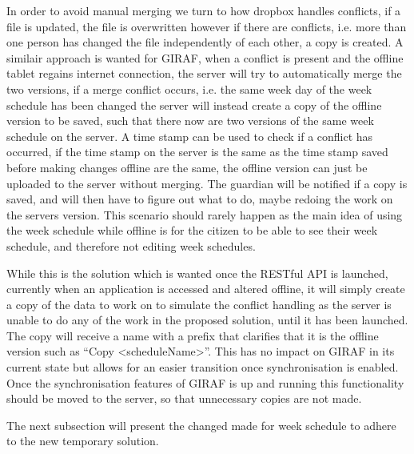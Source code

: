 In order to avoid manual merging we turn to how dropbox handles conflicts, if a file is updated, the file is overwritten however if there are conflicts, i.e. more than one person has changed the file independently of each other, a copy is created.
A similair approach is wanted for GIRAF, when a conflict is present and the offline tablet regains internet connection, the server will try to automatically merge the two versions, if a merge conflict occurs, i.e. the same week day of the week schedule has been changed the server will instead create a copy of the offline version to be saved, such that there now are two versions of the same week schedule on the server.
A time stamp can be used to check if a conflict has occurred, if the time stamp on the server is the same as the time stamp saved before making changes offline are the same, the offline version can just be uploaded to the server without merging.
The guardian will be notified if a copy is saved, and will then have to figure out what to do, maybe redoing the work on the servers version.
This scenario should rarely happen as the main idea of using the week schedule while offline is for the citizen to be able to see their week schedule, and therefore not editing week schedules.

\bigskip
While this is the solution which is wanted once the RESTful API is launched, currently when an application is accessed and altered offline, it will simply create a copy of the data to work on to simulate the conflict handling as the server is unable to do any of the work in the proposed solution, until it has been launched.
The copy will receive a name with a prefix that clarifies that it is the offline version such as \enquote{Copy <scheduleName>}.
This has no impact on GIRAF in its current state but allows for an easier transition once synchronisation is enabled.
Once the synchronisation features of GIRAF is up and running this functionality should be moved to the server, so that unnecessary copies are not made.
 

The next subsection will present the changed made for week schedule to adhere to the new temporary solution.
